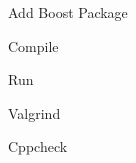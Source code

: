 \begin{DoxyItemize}
\item Add Boost Package 
\begin{DoxyCode}{0}

\end{DoxyCode}

\item Compile 
\begin{DoxyCode}{0}

\end{DoxyCode}

\item Run 
\begin{DoxyCode}{0}

\end{DoxyCode}

\item Valgrind 
\begin{DoxyCode}{0}

\end{DoxyCode}

\item Cppcheck 
\begin{DoxyCode}{0}

\end{DoxyCode}


\end{DoxyItemize}
